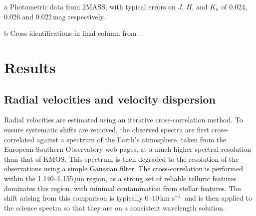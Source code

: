 \documentclass[useAMS,usenatbib]{mn2e}
\def\kms{$\mbox{km s}^{-1}$}
\begin{document}
\begin{table}
\begin{center}
\begin{threeparttable}
\begin{tabular}{lrccccl }
\hline
\end{tabular}
\begin{tablenotes}
\item [a] Photometric data from 2MASS, with typical errors on $J$, $H$, and $K_{\rm s}$ of 0.024, 0.026 and 0.022\,mag respectively.
\item [b] Cross-identifications in final column from~\cite{1974A&AS...15..261R}.
\end{tablenotes}
\end{threeparttable}
\end{center}
\end{table}


\section{Results} %
\label{sec:results}


\subsection{Radial velocities and velocity dispersion} %
\label{sub:radial_velocities}
Radial velocities are estimated using an iterative cross-correlation method.
To ensure systematic shifts are removed, the observed spectra are first cross-correlated against a spectrum of the Earth's atmosphere, taken from the European Southern Observatory web pages\footnotemark, at a much higher spectral resolution than that of KMOS.
This spectrum is then degraded to the resolution of the observations using a simple Gaussian filter.
The cross-correlation is performed within the 1.140--1.155\,$\mu$m region, as a strong set of reliable telluric features dominates this region, with minimal contamination from stellar features.
The shift arising from this comparison is typically 0--10\,\kms~and is then applied to the science spectra so that they are on a consistent wavelength solution.
\end{document}
